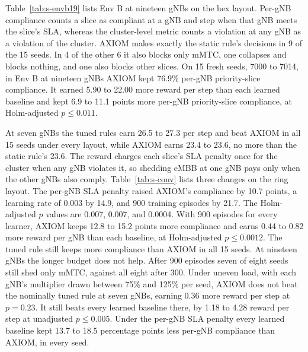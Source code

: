 \documentclass[9pt]{extarticle}
\begin{document}
Table~\ref{tab:s-envb19} lists Env B at nineteen gNBs on the hex layout. Per-gNB compliance counts a slice as compliant at a gNB and step when that gNB meets the slice's SLA, whereas the cluster-level metric counts a violation at any gNB as a violation of the cluster. AXIOM makes exactly the static rule's decisions in 9 of the 15 seeds. In 4 of the other 6 it also blocks only mMTC, one collapses and blocks nothing, and one also blocks other slices. On 15 fresh seeds, 7000 to 7014, in Env B at nineteen gNBs AXIOM kept 76.9\% per-gNB priority-slice compliance. It earned 5.90 to 22.00 more reward per step than each learned baseline and kept 6.9 to 11.1 points more per-gNB priority-slice compliance, at Holm-adjusted $p\leq0.011$.

At seven gNBs the tuned rules earn 26.5 to 27.3 per step and beat AXIOM in all 15 seeds under every layout, while AXIOM earns 23.4 to 23.6, no more than the static rule's 23.6. The reward charges each slice's SLA penalty once for the cluster when any gNB violates it, so shedding eMBB at one gNB pays only when the other gNBs also comply. Table~\ref{tab:s-conv} lists three changes on the ring layout. The per-gNB SLA penalty raised AXIOM's compliance by 10.7 points, a learning rate of 0.003 by 14.9, and 900 training episodes by 21.7. The Holm-adjusted $p$ values are 0.007, 0.007, and 0.0004. With 900 episodes for every learner, AXIOM keeps 12.8 to 15.2 points more compliance and earns 0.44 to 0.82 more reward per gNB than each baseline, at Holm-adjusted $p\leq0.0012$. The tuned rule still keeps more compliance than AXIOM in all 15 seeds. At nineteen gNBs the longer budget does not help. After 900 episodes seven of eight seeds still shed only mMTC, against all eight after 300. Under uneven load, with each gNB's multiplier drawn between 75\% and 125\% per seed, AXIOM does not beat the nominally tuned rule at seven gNBs, earning 0.36 more reward per step at $p=0.23$. It still beats every learned baseline there, by 1.18 to 4.28 reward per step at unadjusted $p\leq0.005$. Under the per-gNB SLA penalty every learned baseline kept 13.7 to 18.5 percentage points less per-gNB compliance than AXIOM, in every seed.
\end{document}
